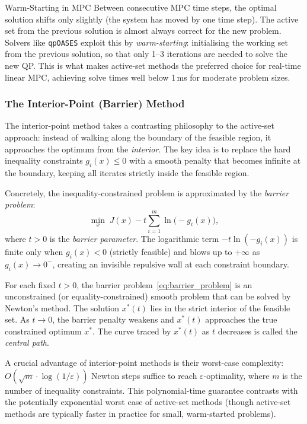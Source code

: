 \begin{notebox}{Warm-Starting in MPC}
	Between consecutive MPC time steps, the optimal solution shifts only slightly (the system has moved by one time step). The active set from the previous solution is almost always correct for the new problem. Solvers like \texttt{qpOASES} exploit this by \emph{warm-starting}: initialising the working set from the previous solution, so that only 1--3 iterations are needed to solve the new QP. This is what makes active-set methods the preferred choice for real-time linear MPC, achieving solve times well below 1\,ms for moderate problem sizes.
\end{notebox}

\subsubsection{The Interior-Point (Barrier) Method}

The interior-point method takes a contrasting philosophy to the active-set approach: instead of walking along the boundary of the feasible region, it approaches the optimum from the \emph{interior}. The key idea is to replace the hard inequality constraints $g_i(x) \leq 0$ with a smooth penalty that becomes infinite at the boundary, keeping all iterates strictly inside the feasible region.

Concretely, the inequality-constrained problem is approximated by the \emph{barrier problem}:
\begin{equation}
	\min_{x} \; J(x) - t \sum_{i=1}^{m} \ln\bigl(-g_i(x)\bigr),
	\label{eq:barrier_problem}
\end{equation}
where $t > 0$ is the \emph{barrier parameter}. The logarithmic term $-t \ln(-g_i(x))$ is finite only when $g_i(x) < 0$ (strictly feasible) and blows up to $+\infty$ as $g_i(x) \to 0^-$, creating an invisible repulsive wall at each constraint boundary.

For each fixed $t > 0$, the barrier problem~\eqref{eq:barrier_problem} is an unconstrained (or equality-constrained) smooth problem that can be solved by Newton's method. The solution $x^*(t)$ lies in the strict interior of the feasible set. As $t \to 0$, the barrier penalty weakens and $x^*(t)$ approaches the true constrained optimum $x^*$. The curve traced by $x^*(t)$ as $t$ decreases is called the \emph{central path}.

A crucial advantage of interior-point methods is their worst-case complexity: $O(\sqrt{m} \cdot \log(1/\varepsilon))$ Newton steps suffice to reach $\varepsilon$-optimality, where $m$ is the number of inequality constraints. This polynomial-time guarantee contrasts with the potentially exponential worst case of active-set methods (though active-set methods are typically faster in practice for small, warm-started problems).


